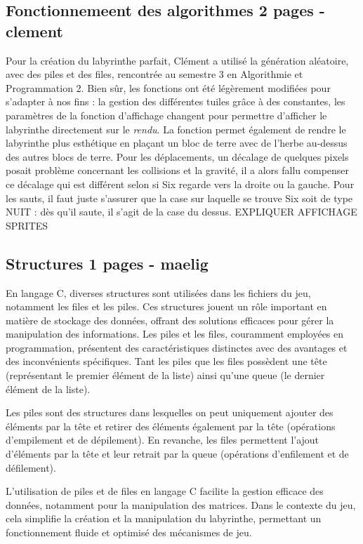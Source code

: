 \documentclass[10pt]{article}
\begin{document}
   \subsection{Fonctionnemeent des algorithmes 2 pages - clement}
   Pour la création du \gls{labyrinthe} parfait, Clément a utilisé la génération aléatoire, avec des \glspl{pile} et des \glspl{file}, rencontrée au semestre 3 en Algorithmie et Programmation 2.
   Bien sûr, les fonctions ont été légèrement modifiées pour s'adapter à nos fins : la gestion des différentes tuiles grâce à des \glspl{constante}, les 
   paramètres de la fonction d'affichage changent pour permettre d'afficher le labyrinthe directement sur le \textit{rendu}. La fonction permet également de rendre le labyrinthe plus esthétique
   en plaçant un bloc de terre avec de l'herbe au-dessus des autres blocs de terre. Pour les déplacements, un décalage de quelques pixels posait problème concernant les collisions et la gravité, il a alors fallu compenser ce décalage qui est différent selon si Six regarde vers
   la droite ou la gauche. Pour les sauts, il faut juste s'assurer que la case sur laquelle se trouve Six soit de type NUIT : dès qu'il saute, il s'agit de la case du dessus.
EXPLIQUER AFFICHAGE SPRITES
   \subsection{Structures 1 pages - maelig}

En langage C, diverses \glspl{structure} sont utilisées dans les fichiers du jeu, notamment les files et les piles. Ces structures jouent un rôle important en matière de stockage des données, offrant des solutions efficaces pour gérer la manipulation des informations. Les piles et les files, couramment employées en programmation, présentent des caractéristiques distinctes avec des avantages et des inconvénients spécifiques. Tant les piles que les files possèdent une tête (représentant le premier élément de la liste) ainsi qu'une queue (le dernier élément de la liste).

Les piles sont des structures dans lesquelles on peut uniquement ajouter des éléments par la tête et retirer des éléments également par la tête (opérations d'empilement et de dépilement). En revanche, les files permettent l'ajout d'éléments par la tête et leur retrait par la queue (opérations d'enfilement et de défilement).

L'utilisation de piles et de files en langage C facilite la gestion efficace des données, notamment pour la manipulation des matrices. Dans le contexte du jeu, cela simplifie la création et la manipulation du labyrinthe, permettant un fonctionnement fluide et optimisé des mécanismes de jeu.
\end{document}
